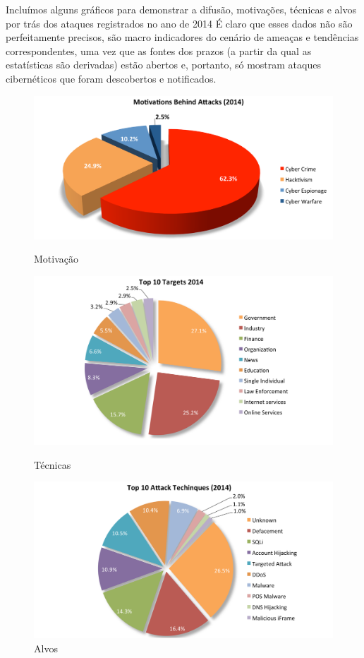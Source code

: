 Incluímos alguns gráficos para demonstrar a difusão, motivações, técnicas e alvos por trás dos ataques registrados no ano de 2014
É claro que esses dados não são perfeitamente precisos, são macro indicadores do cenário de ameaças e tendências correspondentes, uma vez que as fontes dos prazos (a partir da qual as estatísticas são derivadas) estão abertos e, portanto, só mostram ataques cibernéticos que foram descobertos e notificados.


   

\begin{figure}
	\begin{minipage}{.5\textwidth}
		\includegraphics[scale=0.2]{Imagens/hackmageddon_motivation.png}
		\caption{Motivação}
	\end{minipage}
	\begin{minipage}{.5\textwidth}
		\includegraphics[scale=0.2]{Imagens/hackmageddon_targets.png}
		\caption{Técnicas}
	\end{minipage}
	\begin{minipage}{.5\textwidth}
		\includegraphics[scale=0.2]{Imagens/hackmageddon_techniques.png}
		\caption{Alvos}
	\end{minipage}
\end{figure}

